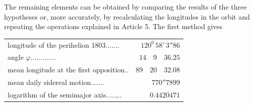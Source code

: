 The remaining elements can be obtained by comparing the results of the three hypotheses or, more accurately, by recalculating the longitudes in the orbit and repeating the operations explained in Article 5. The first method gives
\begin{center}\fontsize{9}{11}\selectfont
\begin{tabular}{@{}p{.69\linewidth}@{\quad}r@{}}
longitude of the perihelion 1803\hfill\mbox{.\hspace{.76em}.\hspace{.76em}.\hspace{.76em}.\hspace{.76em}.\hspace{.76em}.\hspace{.76em}.}&$120^0\,58'\,3''86$\\
angle $\varphi$\hfill\mbox{.\hspace{.76em}.\hspace{.76em}.\hspace{.76em}.\hspace{.76em}.\hspace{.76em}.\hspace{.76em}.\hspace{.76em}.\hspace{.76em}.\hspace{.76em}.\hspace{.76em}.\hspace{.76em}.\hspace{.76em}.}&$14\quad9\quad36.25$\\
mean longitude at the first opposition\hfill\mbox{.\hspace{.76em}.}&$89\quad20\quad32.08$\\
mean daily sidereal motion\hfill\mbox{.\hspace{.76em}.\hspace{.76em}.\hspace{.76em}.\hspace{.76em}.\hspace{.76em}.\hspace{.76em}.}&$770''7899$\\
logarithm of the semimajor axis.\hfill\mbox{.\hspace{.76em}.\hspace{.76em}.\hspace{.76em}.\hspace{.76em},\hspace{.76em}.\hspace{.76em}.}&$0.4420471$
\end{tabular}
\end{center}
